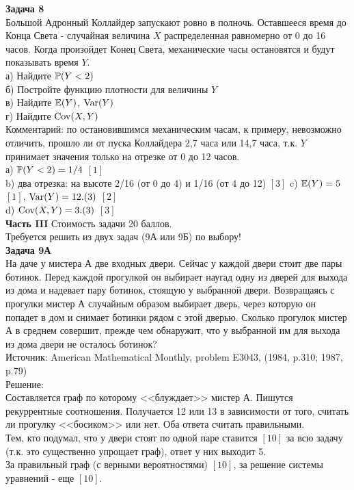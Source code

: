 \documentclass[pdftex,12pt,a4paper]{article}
\begin{document}
\textbf{Задача 8} \\
Большой Адронный Коллайдер запускают ровно в полночь. Оставшееся время до Конца Света - случайная величина $X$ распределенная равномерно от 0 до 16 часов. Когда произойдет Конец Света, механические часы остановятся и будут показывать время $Y$. \\
а) Найдите $\P(Y<2)$ \\
б) Постройте функцию плотности для величины $Y$ \\
в) Найдите $\E(Y)$, $\Var(Y)$\\
г) Найдите $\Cov(X,Y)$ \\
Комментарий: по остановившимся механическим часам, к примеру, невозможно отличить, прошло ли от пуска Коллайдера 2,7 часа или 14,7 часа, т.к. $Y$ принимает значения только на отрезке от 0 до 12 часов. \\
а) $\P(Y<2)=1/4$ $[1]$ \\
b) два отрезка: на высоте 2/16 (от 0 до 4) и 1/16 (от 4 до 12) $[3]$
c) $\E(Y)=5$ $[1]$, $\Var(Y)=12.(3)$ $[2]$ \\
d) $\Cov(X,Y)=3.(3)$ $[3]$ \\


\textbf{Часть III} Стоимость задачи 20 баллов. \\

Требуется решить \textbf{} из двух задач (9А или 9Б) по
выбору! \\

\textbf{Задача 9А} \\
На даче у мистера А две входных двери. Сейчас у каждой двери стоит две пары ботинок. Перед каждой прогулкой он выбирает наугад одну из дверей для выхода из дома и надевает пару ботинок, стоящую у выбранной двери. Возвращаясь с прогулки мистер А случайным образом выбирает дверь, через которую он попадет в дом и снимает ботинки рядом с этой дверью. Сколько прогулок мистер А в среднем совершит, прежде чем обнаружит, что у выбранной им для выхода из дома двери не осталось ботинок? \\
Источник: American Mathematical Monthly, problem E3043, (1984, p.310; 1987, p.79)\\
Решение: \\
Составляется граф по которому <<блуждает>> мистер А. Пишутся рекуррентные соотношения.
Получается 12 или 13 в зависимости от того, считать ли прогулку <<босиком>> или нет.
Оба ответа считать правильными.\\
Тем, кто подумал, что у двери стоят по одной паре ставится $[10]$ за всю задачу (т.к. это существенно упрощает граф), ответ у них выходит 5. \\
За правильный граф (с верными вероятностями) $[10]$, за решение системы уравнений - еще $[10]$. \\
\end{document}
